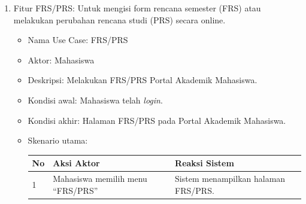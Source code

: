 \begin{enumerate}
	\item Fitur FRS/PRS: Untuk mengisi form rencana semester (FRS) atau melakukan perubahan rencana studi (PRS) secara online. 
	\begin{itemize}
		\item Nama Use Case: FRS/PRS
		\item Aktor: Mahasiswa
		\item Deskripsi: Melakukan FRS/PRS Portal Akademik Mahasiswa.
		\item Kondisi awal: Mahasiswa telah \textit{login}.
		\item Kondisi akhir: Halaman FRS/PRS pada Portal Akademik Mahasiswa.
		\item Skenario utama:
		\begin{table}[h!]
			\centering
			\label{}
			\begin{tabular}{ | m{0.5cm} | m{7cm}| m{6cm} | } 
				\hline
				No & Aksi Aktor & Reaksi Sistem \\ 
				\hline
				1 & Mahasiswa memilih menu ``FRS/PRS'' & Sistem menampilkan halaman FRS/PRS.
				\\ 
				\hline
			\end{tabular}
		\end{table}	
	\end{itemize}


\end{enumerate}
